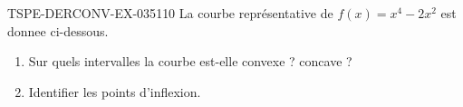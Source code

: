 \begin{exercice}{TSPE-DERCONV-EX-035}{1}{10}
La courbe représentative de $f(x) = x^4 - 2x^2$ est donnee ci-dessous.
\begin{enumerate}
  \item Sur quels intervalles la courbe est-elle convexe ? concave ?
  \item Identifier les points d'inflexion.
\end{enumerate}

\end{exercice}
